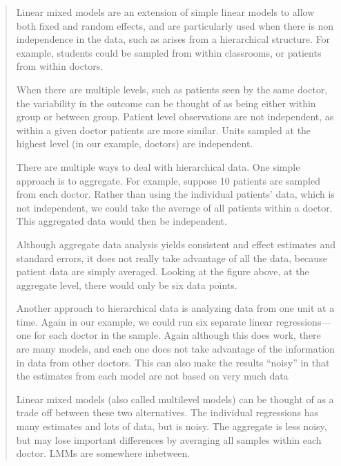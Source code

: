 
\begin{quotation}
Linear mixed models are an extension of simple linear models to allow both fixed and random effects, and are particularly used when there is non independence in the data, such as arises from a hierarchical structure.
For example, students could be sampled from within classrooms, or patients from within doctors.

When there are multiple levels, such as patients seen by the same doctor, the variability in the outcome can be thought of as being either within group or between group.
Patient level observations are not independent, as within a given doctor patients are more similar.
Units sampled at the highest level (in our example, doctors) are independent.

There are multiple ways to deal with hierarchical data. One simple approach is to aggregate. For example, suppose 10 patients are sampled from each doctor. Rather than using the individual patients’ data, which is not independent, we could take the average of all patients within a doctor. This aggregated data would then be independent.

Although aggregate data analysis yields consistent and effect estimates and standard errors, it does not really take advantage of all the data, because patient data are simply averaged. Looking at the figure above, at the aggregate level, there would only be six data points.

Another approach to hierarchical data is analyzing data from one unit at a time. Again in our example, we could run six separate linear regressions—one for each doctor in the sample. Again although this does work, there are many models, and each one does not take advantage of the information in data from other doctors. This can also make the results “noisy” in that the estimates from each model are not based on very much data

Linear mixed models (also called multilevel models) can be thought of as a trade off between these two alternatives. The individual regressions has many estimates and lots of data, but is noisy. The aggregate is less noisy, but may lose important differences by averaging all samples within each doctor. LMMs are somewhere inbetween.

\end{quotation}

